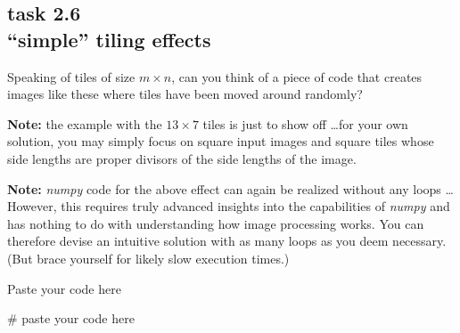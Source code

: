 
\subsection*{task 2.6 \\[1ex] ``simple'' tiling effects}

Speaking of tiles of size $m \times n$, can you think of a piece of code that creates images like these where tiles have been moved around randomly? 
\begin{figure}[h!]
 \hfill
{} \hfill
{} \hfill
{} \hfill
\end{figure}

\textbf{Note:} the example with the $13 \times 7$ tiles is just to show off \ldots for your own solution, you may simply focus on square input images and square tiles whose side lengths are proper divisors of the side lengths of the image.

\textbf{Note:} \emph{numpy} code for the above effect can again be realized without any  loops \ldots However, this requires truly advanced insights into the capabilities of \emph{numpy} and has nothing to do with understanding how image processing works. You can therefore devise an intuitive solution with as many  loops as you deem necessary. (But brace yourself for likely slow execution times.)

Paste your code here %
\begin{python}
# paste your code here

\end{python}
